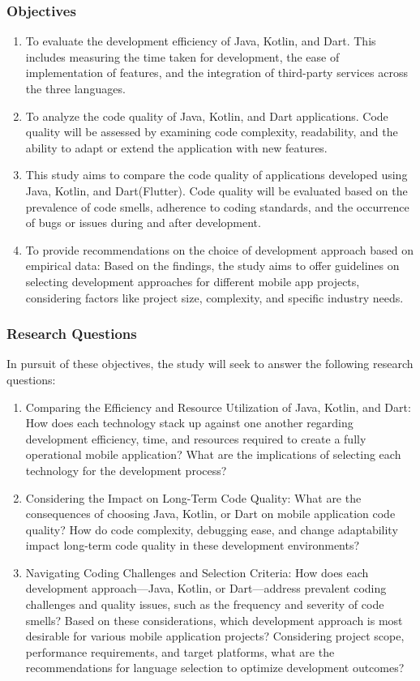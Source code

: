 \subsubsection*{Objectives}
\begin{enumerate}
    \item To evaluate the development efficiency of Java, Kotlin, and Dart. This includes measuring the time taken for development, the ease of implementation of features, and the integration of third-party services across the three languages.
    \item To analyze the code quality of Java, Kotlin, and Dart applications. Code quality will be assessed by examining code complexity, readability, and the ability to adapt or extend the application with new features.
    \item This study aims to compare the code quality of applications developed using Java, Kotlin, and Dart(Flutter). Code quality will be evaluated based on the prevalence of code smells, adherence to coding standards, and the occurrence of bugs or issues during and after development.
    \item To provide recommendations on the choice of development approach based on empirical data: Based on the findings, the study aims to offer guidelines on selecting development approaches for different mobile app projects, considering factors like project size, complexity, and specific industry needs.
\end{enumerate}
\subsubsection*{Research Questions}
In pursuit of these objectives, the study will seek to answer the following research questions:
\begin{enumerate}
    \item Comparing the Efficiency and Resource Utilization of Java, Kotlin, and Dart: How does each technology stack up against one another regarding development efficiency, time, and resources required to create a fully operational mobile application? What are the implications of selecting each technology for the development process?
    \item Considering the Impact on Long-Term Code Quality: What are the consequences of choosing Java, Kotlin, or Dart on mobile application code quality? How do code complexity, debugging ease, and change adaptability impact long-term code quality in these development environments?
    \item Navigating Coding Challenges and Selection Criteria: How does each development approach—Java, Kotlin, or Dart—address prevalent coding challenges and quality issues, such as the frequency and severity of code smells? Based on these considerations, which development approach is most desirable for various mobile application projects? Considering project scope, performance requirements, and target platforms, what are the recommendations for language selection to optimize development outcomes?
\end{enumerate}
